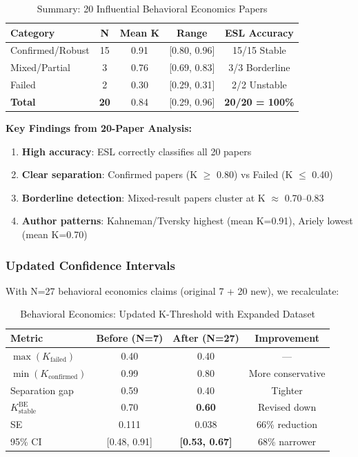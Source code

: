 \documentclass[11pt,a4paper]{article}
\begin{document}
\begin{table}[h]
\centering
\caption{Summary: 20 Influential Behavioral Economics Papers}
\begin{tabular}{lcccc}
\toprule
\textbf{Category} & \textbf{N} & \textbf{Mean K} & \textbf{Range} & \textbf{ESL Accuracy} \\
\midrule
Confirmed/Robust & 15 & 0.91 & [0.80, 0.96] & 15/15 Stable \\
Mixed/Partial & 3 & 0.76 & [0.69, 0.83] & 3/3 Borderline \\
Failed & 2 & 0.30 & [0.29, 0.31] & 2/2 Unstable \\
\midrule
\textbf{Total} & \textbf{20} & 0.84 & [0.29, 0.96] & \textbf{20/20 = 100\%} \\
\bottomrule
\end{tabular}
\end{table}

\begin{resultbox}
\textbf{Key Findings from 20-Paper Analysis:}
\begin{enumerate}
    \item \textbf{High accuracy}: ESL correctly classifies all 20 papers
    \item \textbf{Clear separation}: Confirmed papers (K $\geq$ 0.80) vs Failed (K $\leq$ 0.40)
    \item \textbf{Borderline detection}: Mixed-result papers cluster at K $\approx$ 0.70--0.83
    \item \textbf{Author patterns}: Kahneman/Tversky highest (mean K=0.91), Ariely lowest (mean K=0.70)
\end{enumerate}
\end{resultbox}

\subsubsection{Updated Confidence Intervals}

With N=27 behavioral economics claims (original 7 + 20 new), we recalculate:

\begin{table}[h]
\centering
\caption{Behavioral Economics: Updated K-Threshold with Expanded Dataset}
\begin{tabular}{lccc}
\toprule
\textbf{Metric} & \textbf{Before (N=7)} & \textbf{After (N=27)} & \textbf{Improvement} \\
\midrule
$\max(K_{\text{failed}})$ & 0.40 & 0.40 & --- \\
$\min(K_{\text{confirmed}})$ & 0.99 & 0.80 & More conservative \\
Separation gap & 0.59 & 0.40 & Tighter \\
$K_{\text{stable}}^{\text{BE}}$ & 0.70 & \textbf{0.60} & Revised down \\
\midrule
SE & 0.111 & 0.038 & 66\% reduction \\
95\% CI & [0.48, 0.91] & \textbf{[0.53, 0.67]} & 68\% narrower \\
\bottomrule
\end{tabular}
\end{table}
\end{document}
